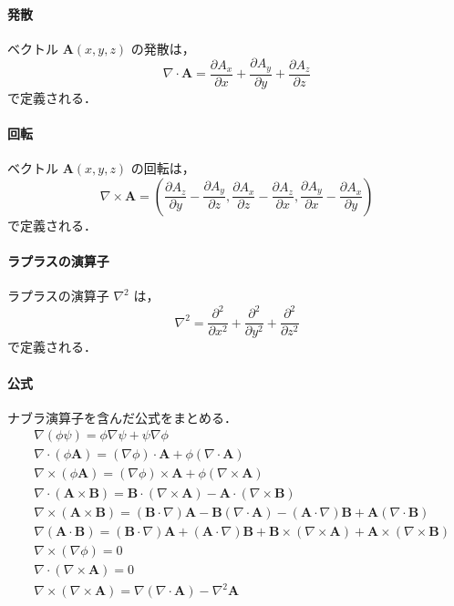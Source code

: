 \documentclass[11pt, a4paper]{ltjsarticle}
\numberwithin{equation}{section}
\begin{document}
\paragraph{発散}
ベクトル $\bm{A} \left(x, y, z \right)$ の発散は，
\[
  \nabla \cdot \bm{A} = \frac{\partial A_x}{\partial x} + \frac{\partial A_y}{\partial y} + \frac{\partial A_z}{\partial z}
\]
で定義される．
\paragraph{回転}
ベクトル $\bm{A} \left(x, y, z \right)$ の回転は，
\[
  \nabla \times \bm{A} = \left( \frac{\partial A_z}{\partial y} - \frac{\partial A_y}{\partial z}, \frac{\partial A_x}{\partial z} - \frac{\partial A_z}{\partial x}, \frac{\partial A_y}{\partial x} - \frac{\partial A_x}{\partial y} \right)
\]
で定義される．
\paragraph{ラプラスの演算子}
ラプラスの演算子 $\nabla^{2}$ は，
\[
  \nabla^{2} = \frac{\partial^{2}}{\partial x^{2}} + \frac{\partial^{2}}{\partial y^{2}} + \frac{\partial^{2}}{\partial z^{2}}
\]
で定義される．
\paragraph{公式}
ナブラ演算子を含んだ公式をまとめる．
\begin{align}
  &\nabla \left( \phi \psi \right) = \phi \nabla \psi + \psi \nabla \phi \\
  &\nabla \cdot \left( \phi \bm{A} \right) = \left( \nabla \phi \right) \cdot \bm{A} + \phi \left( \nabla \cdot \bm{A} \right) \\
  &\nabla \times \left( \phi \bm{A} \right) = \left( \nabla \phi \right) \times \bm{A} + \phi \left( \nabla \times \bm{A} \right) \\
  &\nabla \cdot \left( \bm{A} \times \bm{B} \right) = \bm{B} \cdot \left( \nabla \times \bm{A} \right) - \bm{A} \cdot \left( \nabla \times \bm{B} \right) \\
  &\nabla \times \left( \bm{A} \times \bm{B} \right) = \left( \bm{B} \cdot \nabla \right) \bm{A} - \bm{B} \left( \nabla \cdot \bm{A} \right) - \left( \bm{A} \cdot \nabla \right) \bm{B} + \bm{A} \left( \nabla \cdot \bm{B} \right) \\
  &\nabla \left( \bm{A} \cdot \bm{B} \right) = \left( \bm{B} \cdot \nabla \right) \bm{A} + \left( \bm{A} \cdot \nabla \right) \bm{B} + \bm{B} \times \left( \nabla \times \bm{A} \right) + \bm{A} \times \left( \nabla \times \bm{B} \right) \\
  &\nabla \times \left( \nabla \phi \right) = 0 \\
  &\nabla \cdot \left( \nabla \times \bm{A} \right) = 0 \\
  &\nabla \times \left( \nabla \times \bm{A} \right) = \nabla \left( \nabla \cdot \bm{A} \right) - \nabla^{2} \bm{A}
\end{align}
\end{document}
